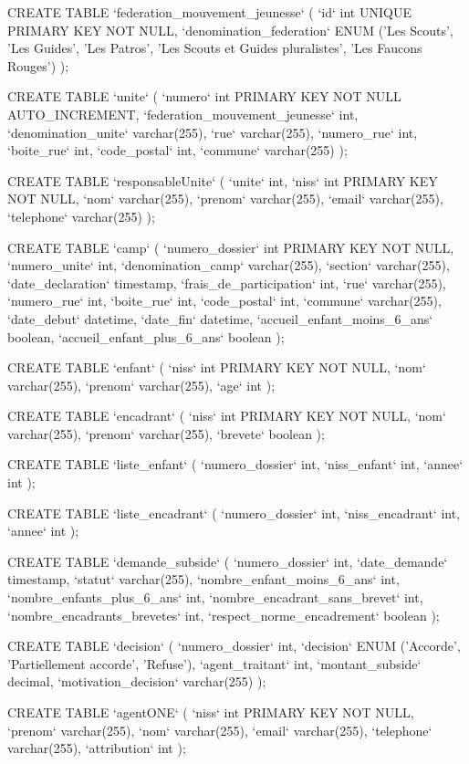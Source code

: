 CREATE TABLE `federation_mouvement_jeunesse` (
  `id` int UNIQUE PRIMARY KEY NOT NULL,
  `denomination_federation` ENUM ('Les Scouts', 'Les Guides', 'Les Patros', 'Les Scouts et Guides pluralistes', 'Les Faucons Rouges')
);

CREATE TABLE `unite` (
  `numero` int PRIMARY KEY NOT NULL AUTO_INCREMENT,
  `federation_mouvement_jeunesse` int,
  `denomination_unite` varchar(255),
  `rue` varchar(255),
  `numero_rue` int,
  `boite_rue` int,
  `code_postal` int,
  `commune` varchar(255)
);

CREATE TABLE `responsableUnite` (
  `unite` int,
  `niss` int PRIMARY KEY NOT NULL,
  `nom` varchar(255),
  `prenom` varchar(255),
  `email` varchar(255),
  `telephone` varchar(255)
);

CREATE TABLE `camp` (
  `numero_dossier` int PRIMARY KEY NOT NULL,
  `numero_unite` int,
  `denomination_camp` varchar(255),
  `section` varchar(255),
  `date_declaration` timestamp,
  `frais_de_participation` int,
  `rue` varchar(255),
  `numero_rue` int,
  `boite_rue` int,
  `code_postal` int,
  `commune` varchar(255),
  `date_debut` datetime,
  `date_fin` datetime,
  `accueil_enfant_moins_6_ans` boolean,
  `accueil_enfant_plus_6_ans` boolean
);

CREATE TABLE `enfant` (
  `niss` int PRIMARY KEY NOT NULL,
  `nom` varchar(255),
  `prenom` varchar(255),
  `age` int
);

CREATE TABLE `encadrant` (
  `niss` int PRIMARY KEY NOT NULL,
  `nom` varchar(255),
  `prenom` varchar(255),
  `brevete` boolean
);

CREATE TABLE `liste_enfant` (
  `numero_dossier` int,
  `niss_enfant` int,
  `annee` int
);

CREATE TABLE `liste_encadrant` (
  `numero_dossier` int,
  `niss_encadrant` int,
  `annee` int
);

CREATE TABLE `demande_subside` (
  `numero_dossier` int,
  `date_demande` timestamp,
  `statut` varchar(255),
  `nombre_enfant_moins_6_ans` int,
  `nombre_enfants_plus_6_ans` int,
  `nombre_encadrant_sans_brevet` int,
  `nombre_encadrants_brevetes` int,
  `respect_norme_encadrement` boolean
);

CREATE TABLE `decision` (
  `numero_dossier` int,
  `decision` ENUM ('Accorde', 'Partiellement accorde', 'Refuse'),
  `agent_traitant` int,
  `montant_subside` decimal,
  `motivation_decision` varchar(255)
);

CREATE TABLE `agentONE` (
  `niss` int PRIMARY KEY NOT NULL,
  `prenom` varchar(255),
  `nom` varchar(255),
  `email` varchar(255),
  `telephone` varchar(255),
  `attribution` int
);


